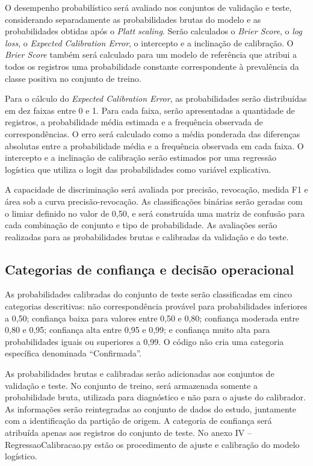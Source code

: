 O desempenho probabilístico será avaliado nos conjuntos de validação e teste, considerando separadamente as probabilidades brutas do modelo e as probabilidades obtidas após o \textit{Platt scaling}. Serão calculados o \textit{Brier Score}, o \textit{log loss}, o \textit{Expected Calibration Error}, o intercepto e a inclinação de calibração. O \textit{Brier Score} também será calculado para um modelo de referência que atribui a todos os registros uma probabilidade constante correspondente à prevalência da classe positiva no conjunto de treino.

Para o cálculo do \textit{Expected Calibration Error}, as probabilidades serão distribuídas em dez faixas entre 0 e 1. Para cada faixa, serão apresentadas a quantidade de registros, a probabilidade média estimada e a frequência observada de correspondências. O erro será calculado como a média ponderada das diferenças absolutas entre a probabilidade média e a frequência observada em cada faixa. O intercepto e a inclinação de calibração serão estimados por uma regressão logística que utiliza o logit das probabilidades como variável explicativa.

A capacidade de discriminação será avaliada por precisão, revocação, medida F1 e área sob a curva precisão-revocação. As classificações binárias serão geradas com o limiar definido no valor de 0,50, e será construída uma matriz de confusão para cada combinação de conjunto e tipo de probabilidade. As avaliações serão realizadas para as probabilidades brutas e calibradas da validação e do teste.


\subsection{Categorias de confiança e decisão operacional} 
As probabilidades calibradas do conjunto de teste serão classificadas em cinco categorias descritivas: não correspondência provável para probabilidades inferiores a 0,50; confiança baixa para valores entre 0,50 e 0,80; confiança moderada entre 0,80 e 0,95; confiança alta entre 0,95 e 0,99; e confiança muito alta para probabilidades iguais ou superiores a 0,99. O código não cria uma categoria específica denominada “Confirmada”.

As probabilidades brutas e calibradas serão adicionadas aos conjuntos de validação e teste. No conjunto de treino, será armazenada somente a probabilidade bruta, utilizada para diagnóstico e não para o ajuste do calibrador. As informações serão reintegradas ao conjunto de dados do estudo, juntamente com a identificação da partição de origem. A categoria de confiança será atribuída apenas aos registros do conjunto de teste. No anexo IV – RegressaoCalibracao.py estão os procedimento de ajuste e calibração do modelo logístico.


